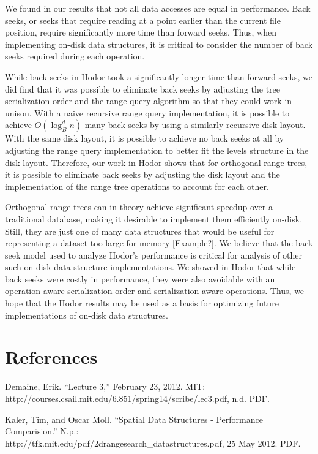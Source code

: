 \documentclass[11pt, oneside]{article}
\begin{document}
    
We found in our results that not all data accesses are equal in performance.
Back seeks, or seeks that require reading at a point earlier than the current
file position, require significantly more time than forward seeks. Thus, when
implementing on-disk data structures, it is critical to consider the number of
back seeks required during each operation. 

While back seeks in Hodor took a significantly longer time than forward seeks,
we did find that it was possible to eliminate back seeks by adjusting the tree
serialization order and the range query algorithm so that they could work in
unison. With a naive recursive range query implementation, it is possible to
achieve $O(\log_B^d n)$ many back seeks by using a similarly recursive disk
layout. With the same disk layout, it is possible to achieve no back seeks at
all by adjusting the range query implementation to better fit the levels
structure in the disk layout. Therefore, our work in Hodor shows that for
orthogonal range trees, it is possible to eliminate back seeks by adjusting the
disk layout and the implementation of the range tree operations to account for
each other. 

Orthogonal range-trees can in theory achieve significant speedup over a
traditional database, making it desirable to implement them efficiently
on-disk. Still, they are just one of many data structures that would be useful
for representing a dataset too large for memory [Example?]. We believe that the
back seek model used to analyze Hodor's performance is critical for analysis of
other such on-disk data structure implementations. We showed in Hodor that
while back seeks were costly in performance, they were also avoidable with an
operation-aware serialization order and serialization-aware operations. Thus,
we hope that the Hodor results may be used as a basis for optimizing future
implementations of on-disk data structures. 


\section{References}

\begin{thebibliography}{1}
    
         Demaine, Erik. ``Lecture 3,'' February 23, 2012.
        MIT: \\ http://courses.csail.mit.edu/6.851/spring14/scribe/lec3.pdf,
        n.d. PDF.

         Kaler, Tim, and Oscar Moll. ``Spatial Data Structures -
        Performance Comparision.'' N.p.: \\
        http://tfk.mit.edu/pdf/2drangesearch\_datastructures.pdf, 25 May 2012.
        PDF.

\end{thebibliography}
\end{document}
